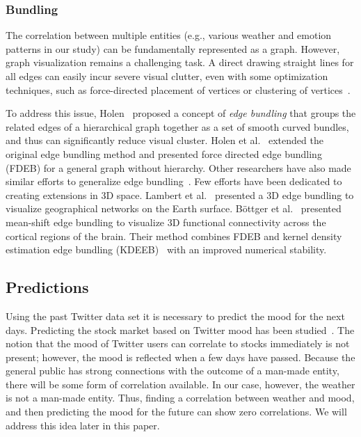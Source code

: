 \subsubsection{Bundling}

The correlation between multiple entities (e.g., various weather and emotion patterns in our study) can be fundamentally represented as a graph. However, graph visualization remains a challenging task. A direct drawing straight lines for all edges can easily incur severe visual clutter, even with some optimization techniques, such as force-directed placement of vertices or clustering of vertices~\cite{KAUFMANN2001}.

To address this issue, Holen~\cite{holten2006hierarchical} proposed a concept of \emph{edge bundling} that groups the related edges of a hierarchical graph together as a set of smooth curved bundles, and thus can significantly reduce visual cluster. Holen et al.~\cite{holten2009force} extended the original edge bundling method and presented force directed edge bundling (FDEB) for a general graph without hierarchy. Other researchers have also made similar efforts to generalize edge bundling~\cite{cui2008geometry,telea2010image,ersoy2011skeleton,gansner2011multilevel}. Few efforts have been dedicated to creating extensions in 3D space. Lambert et al.~\cite{5571244} presented a 3D edge bundling to visualize geographical networks on the Earth surface. B\"{o}ttger et al.~\cite{bottger2014three} presented mean-shift edge bundling to visualize 3D functional connectivity across the cortical regions of the brain. Their method combines FDEB and kernel density estimation edge bundling (KDEEB)~\cite{hurter2012graph} with an improved numerical stability.

\subsection{Predictions}

Using the past Twitter data set it is necessary to predict the mood for the next days. Predicting the stock market based on Twitter mood has been studied~\cite{bollen2011twitter}. The notion that the mood of Twitter users can correlate to stocks immediately is not present; however, the mood is reflected when a few days have passed. Because the general public has strong connections with the outcome of a man-made entity, there will be some form of correlation available. In our case, however, the weather is not a man-made entity. Thus, finding a correlation between weather and mood, and then predicting the mood for the future can show zero correlations. We will address this idea later in this paper.
